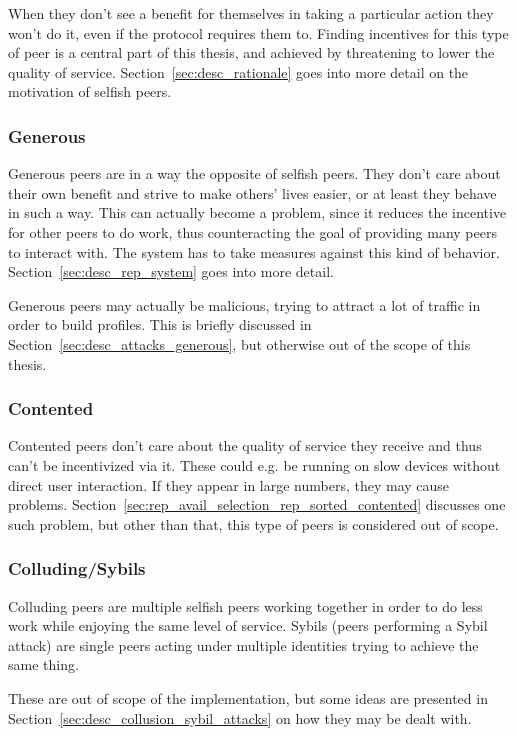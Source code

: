When they don't see a benefit for themselves in taking a particular action they
won't do it, even if the protocol requires them to. Finding incentives for this
type of peer is a central part of this thesis, and achieved by threatening to
lower the quality of service. Section~\ref{sec:desc_rationale} goes into more
detail on the motivation of selfish peers.

\subsubsection{Generous}
\label{sec:desc_generous_peers}
Generous peers are in a way the opposite of selfish peers. They don't care about
their own benefit and strive to make others' lives easier, or at least they
behave in such a way. This can actually become a problem, since it reduces the
incentive for other peers to do work, thus counteracting the goal of providing
many peers to interact with. The system has to take measures against this kind
of behavior. Section~\ref{sec:desc_rep_system} goes into more detail.

Generous peers may actually be malicious, trying to attract a lot of traffic in
order to build profiles. This is briefly discussed in
Section~\ref{sec:desc_attacks_generous}, but otherwise out of the scope of this
thesis.

\subsubsection{Contented}
\label{sec:desc_contented_peers}
Contented peers don't care about the quality of service they receive and thus
can't be incentivized via it. These could e.g. be running on slow devices
without direct user interaction. If they appear in large numbers, they may cause
problems. Section~\ref{sec:rep_avail_selection_rep_sorted_contented} discusses
one such problem, but other than that, this type of peers is considered out of
scope.

\subsubsection{Colluding/Sybils}
Colluding peers are multiple selfish peers working together in order to do less
work while enjoying the same level of service. Sybils (peers performing a Sybil
attack) are single peers acting under multiple identities trying to achieve the
same thing.

These are out of scope of the implementation, but some ideas are presented in
Section~\ref{sec:desc_collusion_sybil_attacks} on how they may be dealt with.


